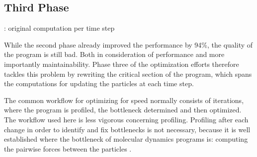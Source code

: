 \documentclass[twoside,11pt]{article}
\begin{document}

\subsection{Third Phase} %
\label{subsec:p3}

\begin{algorithm} %
  \caption{: original computation per time step}
  \label{alg:old}

  \begin{algorithmic}[1]
    \ENDFOR

    \ENDFOR

    \ENDFOR

    \ENDFOR

    \ENDFOR

    \ENDFOR

  \end{algorithmic}
\end{algorithm} %

While the second phase already improved the performance by 94\%,
the quality of the program is still bad.
Both in consideration of performance and more importantly
maintainability.
Phase three of the optimization efforts therefore tackles this
problem by rewriting the critical section of the program, which spans
the computations for updating the particles at each time step.

The common workflow for optimizing for speed normally consists of
iterations, where the program is profiled, the bottleneck determined
and then optimized.
The workflow used here is less vigorous concerning profiling.
Profiling after each change in order to identify and fix bottlenecks
is not necessary, because it is well established where the bottleneck
of molecular dynamics programs is: computing the pairwise forces
between the particles \citep{chiu_et_al_2011}.
\end{document}
